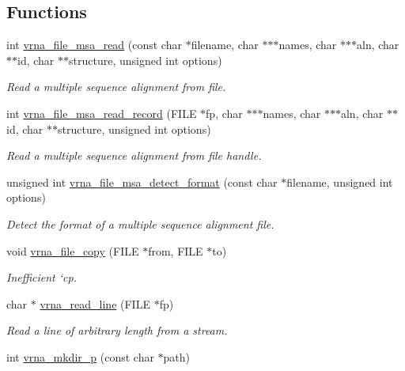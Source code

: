 \subsection*{Functions}
\begin{DoxyCompactItemize}
\item 
int \hyperlink{group__file__utils_gad02d5d12bda54611c915a1019323b7be}{vrna\+\_\+file\+\_\+msa\+\_\+read} (const char $\ast$filename, char $\ast$$\ast$$\ast$names, char $\ast$$\ast$$\ast$aln, char $\ast$$\ast$id, char $\ast$$\ast$structure, unsigned int options)
\begin{DoxyCompactList}\small\item\em Read a multiple sequence alignment from file. \end{DoxyCompactList}\item 
int \hyperlink{group__file__utils_gad4203a438622b2df7bc2f16578d54799}{vrna\+\_\+file\+\_\+msa\+\_\+read\+\_\+record} (F\+I\+LE $\ast$fp, char $\ast$$\ast$$\ast$names, char $\ast$$\ast$$\ast$aln, char $\ast$$\ast$id, char $\ast$$\ast$structure, unsigned int options)
\begin{DoxyCompactList}\small\item\em Read a multiple sequence alignment from file handle. \end{DoxyCompactList}\item 
unsigned int \hyperlink{group__file__utils_gade4fa8136ebb2d0f7eb3f8b59a8658e3}{vrna\+\_\+file\+\_\+msa\+\_\+detect\+\_\+format} (const char $\ast$filename, unsigned int options)
\begin{DoxyCompactList}\small\item\em Detect the format of a multiple sequence alignment file. \end{DoxyCompactList}\item 
void \hyperlink{group__file__utils_ga4382a56d2fee9ed738364b99329edc7c}{vrna\+\_\+file\+\_\+copy} (F\+I\+LE $\ast$from, F\+I\+LE $\ast$to)\hypertarget{group__file__utils_ga4382a56d2fee9ed738364b99329edc7c}{}\label{group__file__utils_ga4382a56d2fee9ed738364b99329edc7c}

\begin{DoxyCompactList}\small\item\em Inefficient `cp\textquotesingle{}. \end{DoxyCompactList}\item 
char $\ast$ \hyperlink{group__file__utils_gad16c270b70a77c753088b29de8a802dc}{vrna\+\_\+read\+\_\+line} (F\+I\+LE $\ast$fp)
\begin{DoxyCompactList}\small\item\em Read a line of arbitrary length from a stream. \end{DoxyCompactList}\item 
int \hyperlink{group__file__utils_gacfa44a974272a4d42c5d391cc780a0ec}{vrna\+\_\+mkdir\+\_\+p} (const char $\ast$path)\hypertarget{group__file__utils_gacfa44a974272a4d42c5d391cc780a0ec}{}\label{group__file__utils_gacfa44a974272a4d42c5d391cc780a0ec}


\end{DoxyCompactItemize}
